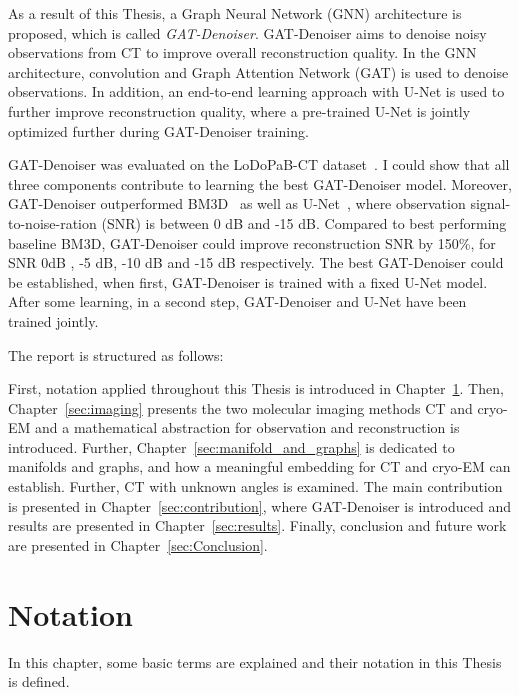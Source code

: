 \clearpage

As a result of this Thesis, a Graph Neural Network (GNN) architecture is proposed, which is called \textit{GAT-Denoiser}.
GAT-Denoiser aims to denoise noisy observations from CT to improve overall reconstruction quality.
In the GNN architecture, convolution and Graph Attention Network (GAT) is used to denoise observations.
In addition, an end-to-end learning approach with U-Net is used to further improve reconstruction quality, 
where a pre-trained U-Net is jointly optimized further during GAT-Denoiser training.

GAT-Denoiser was evaluated on the LoDoPaB-CT dataset~\cite{lodopab-dataset}.
I could show that all three components contribute to learning the best GAT-Denoiser model.
Moreover, GAT-Denoiser outperformed BM3D~\cite{bm3d} as well as U-Net~\cite{unet-tomography},
where observation signal-to-noise-ration (SNR) is between 0 dB and -15 dB.
Compared to best performing baseline BM3D, GAT-Denoiser could improve reconstruction SNR 
by 150\%, for SNR 0dB , -5 dB, -10 dB and -15 dB respectively.
The best GAT-Denoiser could be established, when first, GAT-Denoiser is trained with a fixed U-Net model.
After some learning, in a second step, GAT-Denoiser and U-Net have been trained jointly.


\bigskip

The report is structured as follows: 

First, notation applied throughout this Thesis is introduced in Chapter~\ref{sec:notation}.
Then, Chapter~\ref{sec:imaging} presents the two molecular imaging methods
CT and cryo-EM and a mathematical abstraction for observation and reconstruction is introduced.
Further, Chapter~\ref{sec:manifold_and_graphs} is dedicated to manifolds and graphs,
and how a meaningful embedding for CT and cryo-EM can establish. 
Further, CT with unknown angles is examined.
The main contribution is presented in Chapter~\ref{sec:contribution}, 
where GAT-Denoiser is introduced and results are presented in Chapter~\ref{sec:results}.
Finally, conclusion and future work are presented in Chapter~\ref{sec:Conclusion}.

\chapter{Notation}
\label{sec:notation}

In this chapter, some basic terms are explained and their notation in this Thesis is defined.

